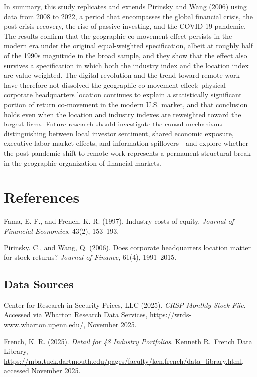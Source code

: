 \documentclass[
  12pt,
]{article}
\begin{document}
In summary, this study replicates and extends Pirinsky and Wang (2006)
using data from 2008 to 2022, a period that encompasses the global
financial crisis, the post-crisis recovery, the rise of passive
investing, and the COVID-19 pandemic. The results confirm that the
geographic co-movement effect persists in the modern era under the
original equal-weighted specification, albeit at roughly half of the
1990s magnitude in the broad sample, and they show that the effect also
survives a specification in which both the industry index and the
location index are value-weighted. The digital revolution and the trend
toward remote work have therefore not dissolved the geographic
co-movement effect: physical corporate headquarters location continues
to explain a statistically significant portion of return co-movement in
the modern U.S. market, and that conclusion holds even when the location
and industry indexes are reweighted toward the largest firms. Future
research should investigate the causal mechanisms---distinguishing
between local investor sentiment, shared economic exposure, executive
labor market effects, and information spillovers---and explore whether
the post-pandemic shift to remote work represents a permanent structural
break in the geographic organization of financial markets.

\newpage

\section{References}\label{references}

\setlength{\parindent}{0em}
\setlength{\parskip}{0.5em}

Fama, E. F., and French, K. R. (1997). Industry costs of equity.
\emph{Journal of Financial Economics}, 43(2), 153--193.

Pirinsky, C., and Wang, Q. (2006). Does corporate headquarters location
matter for stock returns? \emph{Journal of Finance}, 61(4), 1991--2015.

\subsection{Data Sources}\label{data-sources-1}

Center for Research in Security Prices, LLC (2025). \emph{CRSP Monthly
Stock File}. Accessed via Wharton Research Data Services,
\url{https://wrds-www.wharton.upenn.edu/}, November 2025.

French, K. R. (2025). \emph{Detail for 48 Industry Portfolios}. Kenneth
R.~French Data Library,
\url{https://mba.tuck.dartmouth.edu/pages/faculty/ken.french/data_library.html},
accessed November 2025.
\end{document}
